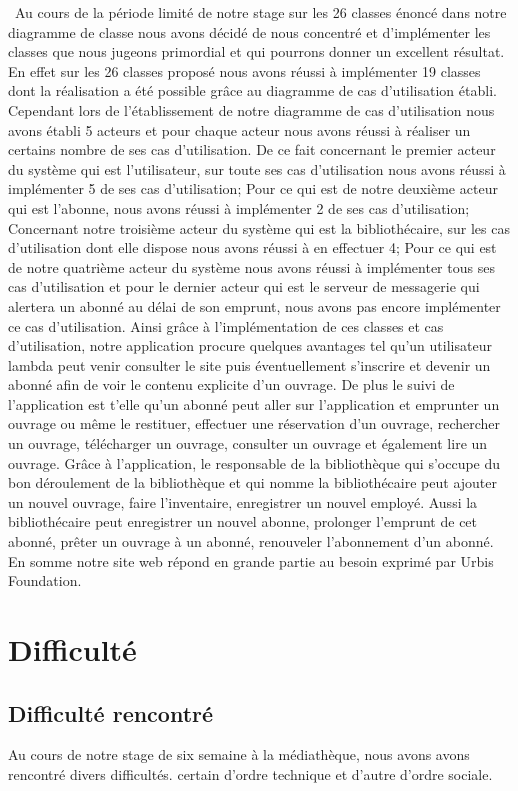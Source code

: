 \documentclass[12pt,a4paper]{article}
\begin{document}
\ Au cours de la période limité de notre stage sur les 26 classes énoncé dans notre diagramme de classe nous avons décidé de nous concentré et d'implémenter les classes que nous jugeons primordial et qui pourrons donner un excellent résultat. En effet sur les 26 classes proposé nous avons réussi à implémenter 19 classes dont la réalisation a été possible grâce au diagramme de cas d'utilisation établi. Cependant lors de l'établissement de notre diagramme de cas d'utilisation nous avons établi 5 acteurs et pour chaque acteur nous avons réussi à réaliser un certains nombre de ses cas d'utilisation. De ce fait concernant le premier acteur du système qui est l'utilisateur, sur toute ses cas d'utilisation nous avons réussi à implémenter 5 de ses cas d'utilisation; Pour ce qui est de notre deuxième acteur qui est l'abonne, nous avons réussi à implémenter 2 de ses cas d'utilisation; Concernant notre troisième acteur du système qui est la bibliothécaire, sur les cas d'utilisation dont elle dispose nous avons réussi à en effectuer 4; Pour ce qui est de notre quatrième acteur du système nous avons réussi à implémenter tous ses cas d'utilisation et pour le dernier acteur qui est le serveur de messagerie qui alertera un abonné au délai de son emprunt, nous avons pas encore implémenter ce cas d'utilisation. Ainsi grâce à l'implémentation de ces classes et cas d'utilisation, notre application procure quelques avantages tel qu'un utilisateur lambda peut venir consulter le site puis éventuellement s'inscrire et devenir un abonné afin de voir le contenu explicite d'un ouvrage. De plus le suivi de l'application est t'elle qu'un abonné peut aller sur l'application et emprunter un ouvrage ou même le restituer, effectuer une réservation d'un ouvrage, rechercher un ouvrage, télécharger un ouvrage, consulter un ouvrage et également lire un ouvrage. Grâce à l'application, le responsable de la bibliothèque qui s'occupe du bon déroulement de la bibliothèque et qui nomme la bibliothécaire peut ajouter un nouvel ouvrage, faire l'inventaire, enregistrer un nouvel employé. Aussi la bibliothécaire peut enregistrer un nouvel abonne, prolonger l'emprunt de cet abonné, prêter un ouvrage à un abonné, renouveler l'abonnement d'un abonné. En somme notre site web répond en grande partie au besoin exprimé par Urbis Foundation.
\section{Difficulté}
\subsection{Difficulté rencontré}
Au cours de notre stage de six semaine à la médiathèque, nous avons avons rencontré divers 
difficultés. certain d'ordre technique et d'autre d'ordre sociale.
\end{document}
